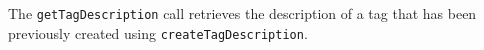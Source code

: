 The \verb+getTagDescription+ call retrieves the description of a tag that has been previously
created using \verb+createTagDescription+.
